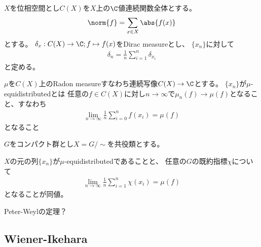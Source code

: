 \documentclass{jsarticle}
\begin{document}
$X$を位相空間とし$C(X)$を$X$上の$\C$値連続関数全体とする。
\begin{align*}
\norm{f}=\sum_{x\in X}\abs{f(x)}
\end{align*}
とする。
$\delta_x:C(X) \to \C; f\mapsto f(x)$をDirac measureとし、
$\{x_n\}$に対して
\begin{align*}
\delta_n=\frac{1}{n}\sum_{i=1}^n\delta_{x_i}
\end{align*}
と定める。

\begin{dfn}
$\mu$を$C(X)$上のRadon measureすなわち連続写像$C(X)\to\C$とする。
$\{x_n\}$が$\mu$-equidistributedとは
任意の$f\in C(X)$に対し$n\to \infty$で$\mu_n(f) \to \mu(f)$となること、すなわち
\begin{align*}
\lim_{n\to\infty}\frac{1}{n}\sum^n_{i=0}f(x_i)=\mu(f)
\end{align*}
となること
\end{dfn}

$G$をコンパクト群とし$X=G/\sim$を共役類とする。
\begin{prop}
$X$の元の列$\{x_n\}$が$\mu$-equidistributedであることと、
任意の$G$の既約指標$\chi$について
\begin{align*}
\lim_{n\to\infty}\frac{1}{n}\sum^n_{i=1}\chi(x_i)=\mu(f)
\end{align*}
となることが同値。
\end{prop}
Peter-Weylの定理？

\subsection{Wiener-Ikehara}
\end{document}
